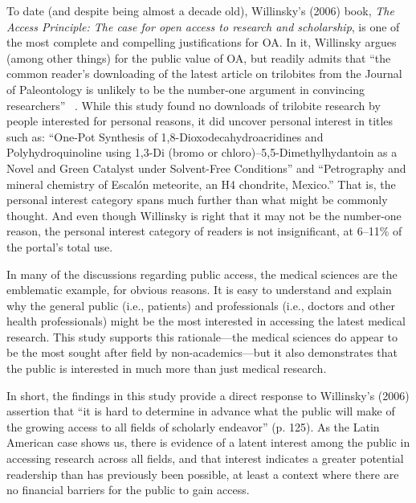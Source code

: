 To date (and despite being almost a decade old), Willinsky's (2006) book, \emph{The Access Principle: The case for open access to research and scholarship}, is one of the most complete and compelling justifications for OA. In it, Willinsky argues (among other things) for the public value of OA, but readily admits that ``the common reader's downloading of the latest article on trilobites from the Journal of Paleontology is unlikely to be the number-one argument in convincing researchers'' ~\citep[p. 125]{Willinsky2006}. While this study found no downloads of trilobite research by people interested for personal reasons, it did uncover personal interest in titles such as: ``One-Pot Synthesis of 1,8-Dioxodecahydroacridines and Polyhydroquinoline using 1,3-Di (bromo or chloro)--5,5-Dimethylhydantoin as a Novel and Green Catalyst under Solvent-Free Conditions'' and ``Petrography and mineral chemistry of Escalón meteorite, an H4 chondrite, Mexico.'' That is, the personal interest category spans much further than what might be commonly thought. And even though Willinsky is right that it may not be the number-one reason, the personal interest category of readers is not insignificant, at 6--11\% of the portal's total use.

In many of the discussions regarding public access, the medical sciences are the emblematic example, for obvious reasons. It is easy to understand and explain why the general public (i.e., patients) and professionals (i.e., doctors and other health professionals) might be the most interested in accessing the latest medical research. This study supports this rationale—the medical sciences do appear to be the most sought after field by non-academics—but it also demonstrates that the public is interested in much more than just medical research.

In short, the findings in this study provide a direct response to Willinsky's (2006) assertion that ``it is hard to determine in advance what the public will make of the growing access to all fields of scholarly endeavor'' (p. 125). As the Latin American case shows us, there is evidence of a latent interest among the public in accessing research across all fields, and that interest indicates a greater potential readership than has previously been possible, at least a context where there are no financial barriers for the public to gain access.

